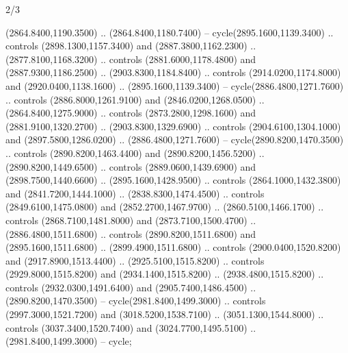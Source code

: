 \begin{flagdescription}{2/3}
\begin{scope}[shift={(0.5\flaglength,0.5)},scale=\flagwidth/130]
\begin{scope}[y=0.01mm, x=0.01mm,shift={(-3365,-2250)}]
  (2864.8400,1190.3500) .. (2864.8400,1180.7400) -- cycle(2895.1600,1139.3400)
  .. controls (2898.1300,1157.3400) and (2887.3800,1162.2300) ..
  (2877.8100,1168.3200) .. controls (2881.6000,1178.4800) and
  (2887.9300,1186.2500) .. (2903.8300,1184.8400) .. controls
  (2914.0200,1174.8000) and (2920.0400,1138.1600) .. (2895.1600,1139.3400) --
  cycle(2886.4800,1271.7600) .. controls (2886.8000,1261.9100) and
  (2846.0200,1268.0500) .. (2864.8400,1275.9000) .. controls
  (2873.2800,1298.1600) and (2881.9100,1320.2700) .. (2903.8300,1329.6900) ..
  controls (2904.6100,1304.1000) and (2897.5800,1286.0200) ..
  (2886.4800,1271.7600) -- cycle(2890.8200,1470.3500) .. controls
  (2890.8200,1463.4400) and (2890.8200,1456.5200) .. (2890.8200,1449.6500) ..
  controls (2889.0600,1439.6900) and (2898.7500,1440.6600) ..
  (2895.1600,1428.9500) .. controls (2864.1000,1432.3800) and
  (2841.7200,1444.1000) .. (2838.8300,1474.4500) .. controls
  (2849.6100,1475.0800) and (2852.2700,1467.9700) .. (2860.5100,1466.1700) ..
  controls (2868.7100,1481.8000) and (2873.7100,1500.4700) ..
  (2886.4800,1511.6800) .. controls (2890.8200,1511.6800) and
  (2895.1600,1511.6800) .. (2899.4900,1511.6800) .. controls
  (2900.0400,1520.8200) and (2917.8900,1513.4400) .. (2925.5100,1515.8200) ..
  controls (2929.8000,1515.8200) and (2934.1400,1515.8200) ..
  (2938.4800,1515.8200) .. controls (2932.0300,1491.6400) and
  (2905.7400,1486.4500) .. (2890.8200,1470.3500) -- cycle(2981.8400,1499.3000)
  .. controls (2997.3000,1521.7200) and (3018.5200,1538.7100) ..
  (3051.1300,1544.8000) .. controls (3037.3400,1520.7400) and
  (3024.7700,1495.5100) .. (2981.8400,1499.3000) -- cycle;
\end{scope}
\end{scope}
\fi
\framecode{}
\end{flagdescription}
